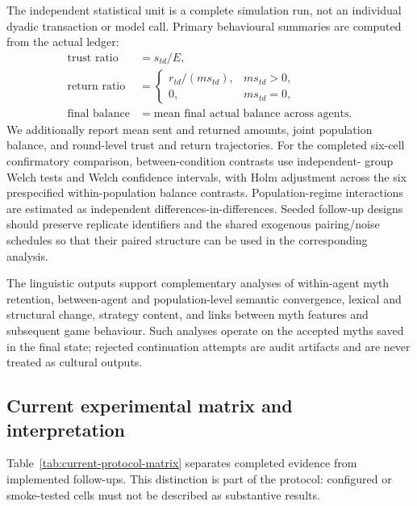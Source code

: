 The independent statistical unit is a complete simulation run, not an
individual dyadic transaction or model call. Primary behavioural summaries are
computed from the actual ledger:
\begin{align}
    \text{trust ratio} &= s_{td}/E, \\
    \text{return ratio} &=
    \begin{cases}
        r_{td}/(m s_{td}), & m s_{td}>0,\\
        0, & m s_{td}=0,
    \end{cases} \\
    \text{final balance} &= \text{mean final actual balance across agents}.
\end{align}
We additionally report mean sent and returned amounts, joint population
balance, and round-level trust and return trajectories. For the completed
six-cell confirmatory comparison, between-condition contrasts use independent-
group Welch tests and Welch confidence intervals, with Holm adjustment across
the six prespecified within-population balance contrasts. Population-regime
interactions are estimated as independent differences-in-differences. Seeded
follow-up designs should preserve replicate identifiers and the shared
exogenous pairing/noise schedules so that their paired structure can be used in
the corresponding analysis.

The linguistic outputs support complementary analyses of within-agent myth
retention, between-agent and population-level semantic convergence, lexical
and structural change, strategy content, and links between myth features and
subsequent game behaviour. Such analyses operate on the accepted myths saved in
the final state; rejected continuation attempts are audit artifacts and are
never treated as cultural outputs.

\subsection{Current experimental matrix and interpretation}
\label{sec:protocol-current-matrix}

Table~\ref{tab:current-protocol-matrix} separates completed evidence from
implemented follow-ups. This distinction is part of the protocol: configured
or smoke-tested cells must not be described as substantive results.


